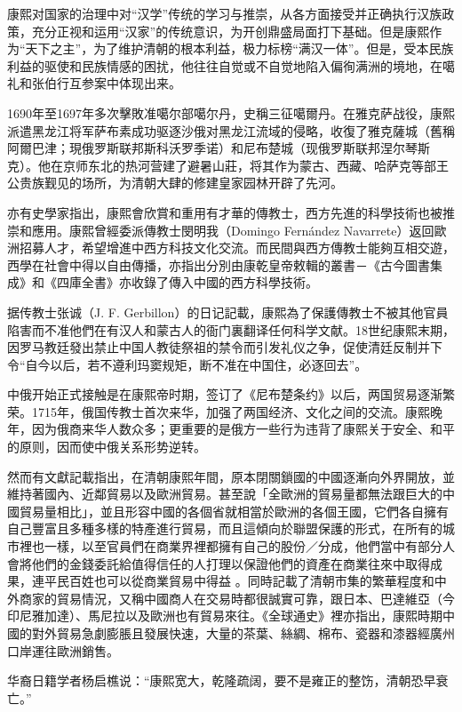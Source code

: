 康熙对国家的治理中对“汉学”传统的学习与推崇，从各方面接受并正确执行汉族政策，充分正视和运用“汉家”的传统意识，为开创鼎盛局面打下基础。但是康熙作为“天下之主”，为了维护清朝的根本利益，极力标榜“满汉一体”。但是，受本民族利益的驱使和民族情感的困扰，他往往自觉或不自觉地陷入偏徇满洲的境地，在噶礼和张伯行互参案中体现出来。

1690年至1697年多次擊敗准噶尔部噶尔丹，史稱三征噶爾丹。在雅克萨战役，康熙派遣黑龙江将军萨布素成功驱逐沙俄对黑龙江流域的侵略，收復了雅克薩城（舊稱阿爾巴津；現俄罗斯联邦斯科沃罗季诺）和尼布楚城（现俄罗斯联邦涅尔琴斯克）。他在京师东北的热河营建了避暑山莊，将其作为蒙古、西藏、哈萨克等部王公贵族觐见的场所，为清朝大肆的修建皇家园林开辟了先河。

亦有史學家指出，康熙會欣賞和重用有才華的傳教士，西方先進的科學技術也被推崇和應用。康熙曾經委派傳教士閔明我（Domingo Fernández Navarrete）返回歐洲招募人才，希望增進中西方科技文化交流。而民間與西方傳教士能夠互相交遊，西學在社會中得以自由傳播，亦指出分別由康乾皇帝敕輯的叢書－《古今圖書集成》和《四庫全書》亦收錄了傳入中國的西方科學技術。

据传教士张诚（J. F. Gerbillon）的日记記載，康熙為了保護傳教士不被其他官員陷害而不准他們在有汉人和蒙古人的衙门裏翻译任何科学文献。18世纪康熙末期，因罗马教廷發出禁止中国人教徒祭祖的禁令而引发礼仪之争，促使清廷反制并下令“自今以后，若不遵利玛窦规矩，断不准在中国住，必逐回去”。

中俄开始正式接触是在康熙帝时期，签订了《尼布楚条约》以后，两国贸易逐渐繁荣。1715年，俄国传教士首次来华，加强了两国经济、文化之间的交流。康熙晚年，因为俄商来华人数众多；更重要的是俄方一些行为违背了康熙关于安全、和平的原则，因而使中俄关系形势逆转。

然而有文獻記載指出，在清朝康熙年間，原本閉關鎖國的中國逐漸向外界開放，並維持著國內、近鄰貿易以及歐洲貿易。甚至說「全歐洲的貿易量都無法跟巨大的中國貿易量相比」，並且形容中國的各個省就相當於歐洲的各個王國，它們各自擁有自己豐富且多種多樣的特產進行貿易，而且這傾向於聯盟保護的形式，在所有的城市裡也一樣，以至官員們在商業界裡都擁有自己的股份／分成，他們當中有部分人會將他們的金錢委託給值得信任的人打理以保證他們的資產在商業往來中取得成果，連平民百姓也可以從商業貿易中得益 。同時記載了清朝市集的繁華程度和中外商家的貿易情況，又稱中國商人在交易時都很誠實可靠，跟日本、巴達維亞（今印尼雅加達）、馬尼拉以及歐洲也有貿易來往。《全球通史》裡亦指出，康熙時期中國的對外貿易急劇膨脹且發展快速，大量的茶葉、絲綢、棉布、瓷器和漆器經廣州口岸運往歐洲銷售。

华裔日籍学者杨启樵说：“康熙宽大，乾隆疏阔，要不是雍正的整饬，清朝恐早衰亡。”

